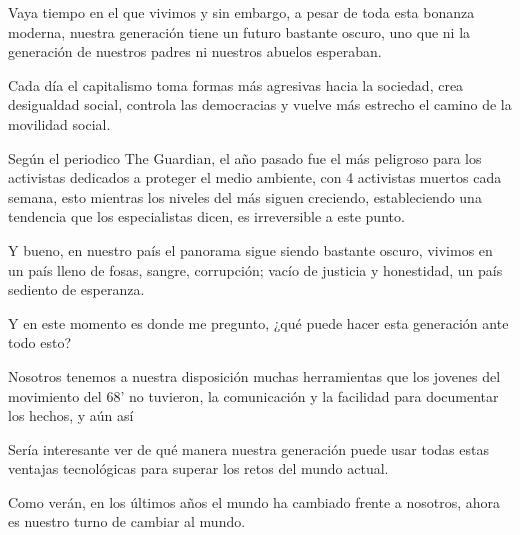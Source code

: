 \documentclass[a4paper,12pt]{article}
\begin{document}
Vaya tiempo en el que vivimos y sin embargo, a pesar de toda esta bonanza moderna, nuestra generación tiene un futuro bastante oscuro, uno que ni la generación de nuestros padres ni nuestros
abuelos esperaban. 

Cada día el capitalismo toma formas más agresivas hacia la sociedad, crea desigualdad social, controla las democracias y vuelve más estrecho el camino de la movilidad social.

Según el periodico The Guardian, el año pasado fue el más peligroso para los activistas dedicados a proteger el medio ambiente, con 4 activistas muertos cada semana, esto mientras los niveles del más siguen creciendo, estableciendo una tendencia que los especialistas dicen, es irreversible a este punto.

Y bueno, en nuestro país el panorama sigue siendo bastante oscuro, vivimos en un país lleno de fosas, sangre, corrupción; vacío de justicia y honestidad, un país sediento de esperanza.

Y en este momento es donde me pregunto, ¿qué puede hacer esta generación ante todo esto?

Nosotros tenemos a nuestra disposición muchas herramientas que los jovenes del movimiento del 68' no
tuvieron, la comunicación y la facilidad para documentar los hechos, y aún así 

Sería interesante ver de qué manera nuestra generación puede usar todas estas ventajas tecnológicas para superar los retos del mundo actual.

Como verán, en los últimos años el mundo ha cambiado frente a nosotros, ahora es nuestro turno de cambiar al mundo.
\end{document}
